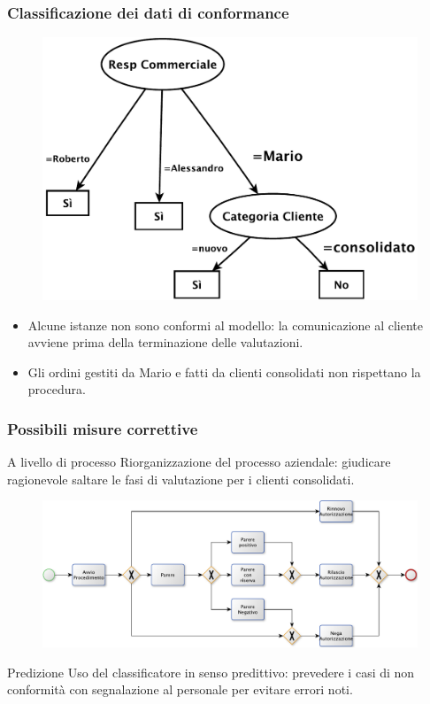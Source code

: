 \begin{frame}
	\frametitle{Classificazione dei dati di conformance}
	\begin{figure}
	\includegraphics[scale=0.3]{./fig/decisiontree}
	\end{figure}
	\begin{block}{}
	\begin{itemize}
	\item Alcune istanze non sono conformi al modello: la comunicazione al cliente avviene prima della terminazione delle valutazioni.
	\item Gli ordini gestiti da Mario e fatti da clienti consolidati non rispettano la procedura.
	\end{itemize}
	\end{block}
	\end{frame}
	
	\begin{frame}
	\frametitle{Possibili misure correttive}
	\begin{block}{A livello di processo}
	Riorganizzazione del processo aziendale: giudicare ragionevole saltare le fasi di valutazione per i clienti consolidati.
	\end{block}
	\begin{figure}
	\includegraphics[scale=0.4]{./fig/BPMN}
	\end{figure}
	\begin{block}{Predizione}
	Uso del classificatore in senso predittivo: prevedere i casi di non conformità con segnalazione al personale per evitare errori noti.  
	\end{block}
	\end{frame}
	